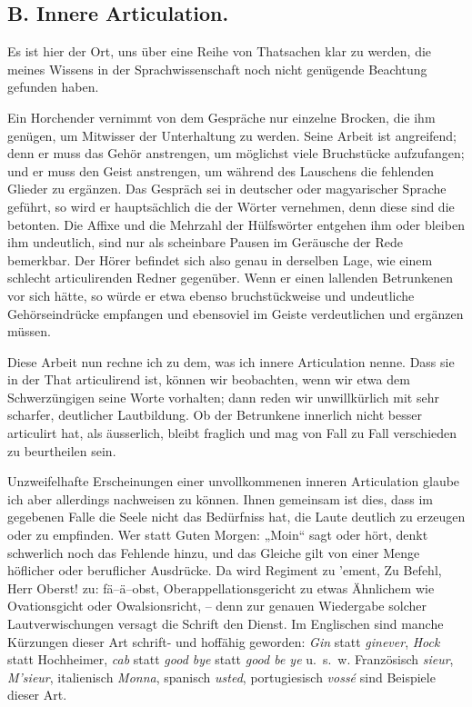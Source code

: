 \subsection*{B. Innere Articulation.}\label{IV.IV.18B}

\largerpage[-1]Es ist hier der Ort, uns über eine Reihe von Thatsachen klar zu werden, die meines Wissens in der Sprachwissenschaft noch nicht genügende Beachtung gefunden haben.

Ein Horchender vernimmt von dem Gespräche  nur einzelne Brocken, die ihm genügen, um Mitwisser der Unterhaltung zu werden. Seine Arbeit ist angreifend; denn er muss das Gehör anstrengen, um \label{fp.411} möglichst viele Bruchstücke aufzufangen; und er muss den Geist anstrengen, um während des Lauschens die fehlenden Glieder zu ergänzen. Das Gespräch sei in deutscher oder magyarischer Sprache geführt, so wird er hauptsächlich die  der Wörter vernehmen, denn diese sind die betonten. Die Affixe und die Mehrzahl der Hülfswörter entgehen ihm oder bleiben ihm undeutlich, sind nur als scheinbare Pausen im Geräusche der Rede bemerkbar. Der Hörer befindet sich also genau in derselben Lage, wie einem schlecht articulirenden Redner gegenüber. Wenn er einen lallenden Betrunkenen vor sich hätte, so würde er etwa ebenso bruchstückweise und undeutliche Gehörseindrücke empfangen und ebensoviel im Geiste verdeutlichen und ergänzen müssen.

Diese Arbeit nun rechne ich zu dem, was ich innere Articulation nenne. Dass sie in der That articulirend ist, können wir beobachten, wenn wir etwa dem Schwerzüngigen seine Worte vorhalten; dann reden wir unwillkürlich mit sehr scharfer, deutlicher Lautbildung. Ob der Betrunkene innerlich nicht besser \label{sp.433} articulirt hat, als äusserlich, bleibt fraglich und mag von Fall zu Fall verschieden zu beurtheilen sein.

Unzweifelhafte Erscheinungen einer unvollkommenen inneren Articulation glaube ich aber allerdings nachweisen zu können. Ihnen gemeinsam ist dies, dass im gegebenen Falle die Seele nicht das Bedürfniss hat, die Laute deutlich zu erzeugen oder zu empfinden. Wer statt Guten Morgen: „Moin“ sagt oder hört, denkt schwerlich noch das Fehlende hinzu, und das Gleiche gilt von einer Menge höflicher oder beruflicher Ausdrücke. Da wird Regiment zu ’ement, Zu Befehl, Herr Oberst! zu: fä–ä–obst, Oberappellationsgericht zu etwas Ähnlichem wie Ovationsgicht oder Owalsionsricht, – denn zur genauen Wiedergabe solcher Lautverwischungen versagt die Schrift den Dienst. Im Englischen sind manche Kürzungen dieser Art schrift- und hoffähig geworden: \textit{Gin} statt \textit{ginever}, \textit{Hock} statt Hochheimer, \textit{cab} statt  \textit{good bye} statt \textit{good be ye} u.~s.~w. Französisch \textit{sieur}, \textit{M’sieur}, italienisch \textit{Monna}, spanisch \textit{usted}, portugiesisch \textit{vossé} sind Beispiele dieser Art.


